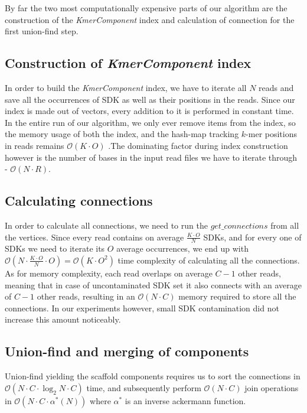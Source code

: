 By far the two most computationally expensive parts of our algorithm are the construction of the \textit{KmerComponent} index and calculation of connection for the first union-find step.

\subsection{Construction of \textit{KmerComponent} index}

In order to build the \textit{KmerComponent} index, we have to iterate all $N$ reads and save all the occurrences of SDK as well as their positions in the reads. Since our index is made out of vectors, every addition to it is performed in constant time. In the entire run of our algorithm, we only ever remove items from the index, so the memory usage of both the index, and the hash-map tracking $k$-mer positions in reads remains $\mathcal{O}(K \cdot O)$ .The dominating factor during index construction however is the number of bases in the input read files we have to iterate through - $\mathcal{O}(N \cdot R)$.

\subsection{Calculating connections}

In order to calculate all connections, we need to run the $get\_connections$ from all the vertices. Since every read contains on average $\frac{K \cdot O}{N}$ SDKs, and for every one of SDKs we need to iterate its $O$ average occurrences, we end up with $\mathcal{O}(N \cdot \frac{K \cdot O}{N} \cdot O) = \mathcal{O}(K \cdot O^2)$ time complexity of calculating all the connections. As for memory complexity, each read overlaps on average $C - 1$ other reads, meaning that in case of uncontaminated SDK set it also connects with an average of $C - 1$ other reads, resulting in an $\mathcal{O}(N \cdot C)$ memory required to store all the connections. In our experiments however, small SDK contamination did not increase this amount noticeably.

\subsection{Union-find and merging of components}
Union-find yielding the scaffold components requires us to sort the connections in $\mathcal{O}(N \cdot C \cdot \log_2{N \cdot C})$ time, and subsequently perform $\mathcal{O}(N \cdot C)$ join operations in $\mathcal{O}(N \cdot C \cdot \alpha^*(N))$ where $\alpha^*$ is an inverse ackermann function.


